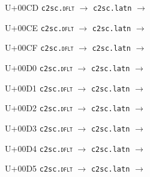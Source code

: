 \documentclass{article}
\begin{document}
\begin{substitutions}
\goodbreak

U+00CD  \linebreak
    \texttt{c2sc.\textsc{dflt}} $\to$  \linebreak
    \texttt{c2sc.latn} $\to$  

\goodbreak

U+00CE  \linebreak
    \texttt{c2sc.\textsc{dflt}} $\to$  \linebreak
    \texttt{c2sc.latn} $\to$  

\goodbreak

U+00CF  \linebreak
    \texttt{c2sc.\textsc{dflt}} $\to$  \linebreak
    \texttt{c2sc.latn} $\to$  

\goodbreak

U+00D0  \linebreak
    \texttt{c2sc.\textsc{dflt}} $\to$  \linebreak
    \texttt{c2sc.latn} $\to$  

\goodbreak

U+00D1  \linebreak
    \texttt{c2sc.\textsc{dflt}} $\to$  \linebreak
    \texttt{c2sc.latn} $\to$  

\goodbreak

U+00D2  \linebreak
    \texttt{c2sc.\textsc{dflt}} $\to$  \linebreak
    \texttt{c2sc.latn} $\to$  

\goodbreak

U+00D3  \linebreak
    \texttt{c2sc.\textsc{dflt}} $\to$  \linebreak
    \texttt{c2sc.latn} $\to$  

\goodbreak

U+00D4  \linebreak
    \texttt{c2sc.\textsc{dflt}} $\to$  \linebreak
    \texttt{c2sc.latn} $\to$  

\goodbreak

U+00D5  \linebreak
    \texttt{c2sc.\textsc{dflt}} $\to$  \linebreak
    \texttt{c2sc.latn} $\to$  


\end{substitutions}
\end{document}
